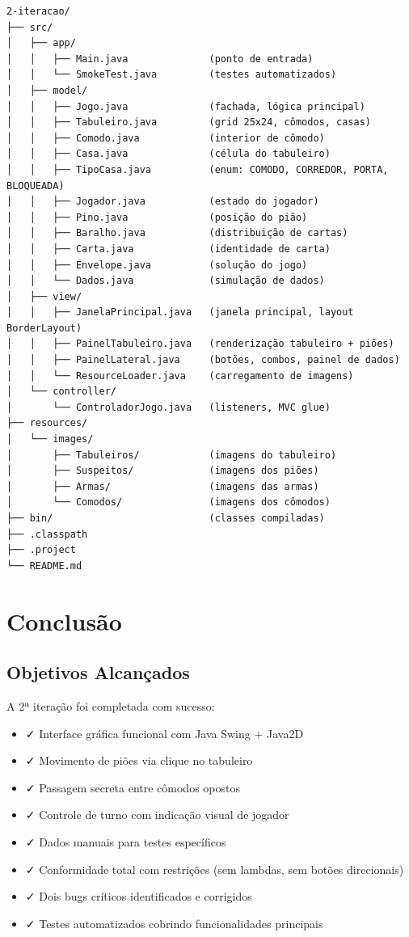 \documentclass[12pt,a4paper]{report}
\begin{document}
\begin{lstlisting}
2-iteracao/
├── src/
│   ├── app/
│   │   ├── Main.java              (ponto de entrada)
│   │   └── SmokeTest.java         (testes automatizados)
│   ├── model/
│   │   ├── Jogo.java              (fachada, lógica principal)
│   │   ├── Tabuleiro.java         (grid 25x24, cômodos, casas)
│   │   ├── Comodo.java            (interior de cômodo)
│   │   ├── Casa.java              (célula do tabuleiro)
│   │   ├── TipoCasa.java          (enum: COMODO, CORREDOR, PORTA, BLOQUEADA)
│   │   ├── Jogador.java           (estado do jogador)
│   │   ├── Pino.java              (posição do pião)
│   │   ├── Baralho.java           (distribuição de cartas)
│   │   ├── Carta.java             (identidade de carta)
│   │   ├── Envelope.java          (solução do jogo)
│   │   └── Dados.java             (simulação de dados)
│   ├── view/
│   │   ├── JanelaPrincipal.java   (janela principal, layout BorderLayout)
│   │   ├── PainelTabuleiro.java   (renderização tabuleiro + piões)
│   │   ├── PainelLateral.java     (botões, combos, painel de dados)
│   │   └── ResourceLoader.java    (carregamento de imagens)
│   └── controller/
│       └── ControladorJogo.java   (listeners, MVC glue)
├── resources/
│   └── images/
│       ├── Tabuleiros/            (imagens do tabuleiro)
│       ├── Suspeitos/             (imagens dos piões)
│       ├── Armas/                 (imagens das armas)
│       └── Comodos/               (imagens dos cômodos)
├── bin/                           (classes compiladas)
├── .classpath
├── .project
└── README.md
\end{lstlisting}

\chapter{Conclusão}

\section{Objetivos Alcançados}

A 2ª iteração foi completada com sucesso:

\begin{itemize}
    \item ✓ Interface gráfica funcional com Java Swing + Java2D
    \item ✓ Movimento de piões via clique no tabuleiro
    \item ✓ Passagem secreta entre cômodos opostos
    \item ✓ Controle de turno com indicação visual de jogador
    \item ✓ Dados manuais para testes específicos
    \item ✓ Conformidade total com restrições (sem lambdas, sem botões direcionais)
    \item ✓ Dois bugs críticos identificados e corrigidos
    \item ✓ Testes automatizados cobrindo funcionalidades principais
\end{itemize}
\end{document}
